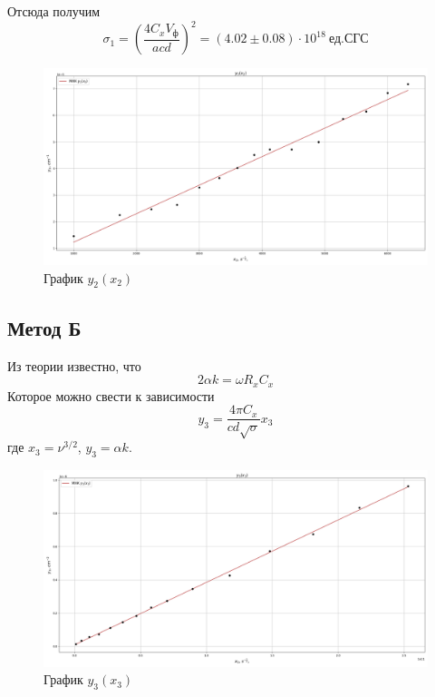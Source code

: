 \documentclass[a4paper,12pt]{article}
\theoremstyle{definition}
\begin{document}
	Отсюда получим
	\begin{equation}
		\sigma_1 = \left(\frac{4C_xV_\text{ф}}{acd}\right)^2=(4.02\pm0.08)\cdot10^{18}\:\text{ед.СГС}
	\end{equation}
	
	\begin{figure}[h]
		\centering
		\includegraphics[scale=0.38]{graph51.png}
		\caption{График $y_2(x_2)$}
	\end{figure}
	
	\subsection{Метод Б}
	Из теории известно, что 
	\begin{equation}
		2\alpha k=\omega R_xC_x
	\end{equation}
	Которое можно свести к зависимости
	\begin{equation}
		y_3=\frac{4\pi C_x}{cd\sqrt{\sigma}}x_3
	\end{equation}
	где $x_3=\nu^{3/2}$, $y_3=\alpha k$.
	\begin{figure}[h]
		\centering
		\includegraphics[scale=0.38]{graph52.png}
		\caption{График $y_3(x_3)$}
	\end{figure}
\end{document}
